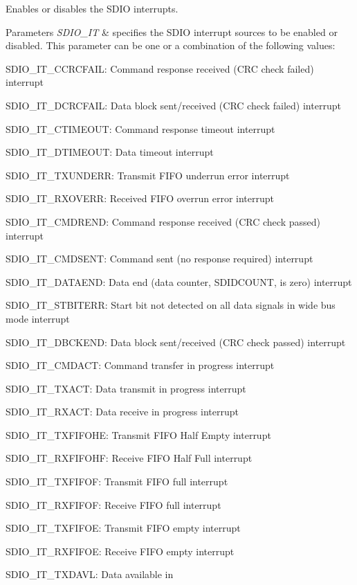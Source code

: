 Enables or disables the S\+D\+IO interrupts. 


\begin{DoxyParams}{Parameters}
{\em S\+D\+I\+O\+\_\+\+IT} & specifies the S\+D\+IO interrupt sources to be enabled or disabled. This parameter can be one or a combination of the following values\+: \begin{DoxyItemize}
\item S\+D\+I\+O\+\_\+\+I\+T\+\_\+\+C\+C\+R\+C\+F\+A\+IL\+: Command response received (C\+RC check failed) interrupt \item S\+D\+I\+O\+\_\+\+I\+T\+\_\+\+D\+C\+R\+C\+F\+A\+IL\+: Data block sent/received (C\+RC check failed) interrupt \item S\+D\+I\+O\+\_\+\+I\+T\+\_\+\+C\+T\+I\+M\+E\+O\+UT\+: Command response timeout interrupt \item S\+D\+I\+O\+\_\+\+I\+T\+\_\+\+D\+T\+I\+M\+E\+O\+UT\+: Data timeout interrupt \item S\+D\+I\+O\+\_\+\+I\+T\+\_\+\+T\+X\+U\+N\+D\+E\+RR\+: Transmit F\+I\+FO underrun error interrupt \item S\+D\+I\+O\+\_\+\+I\+T\+\_\+\+R\+X\+O\+V\+E\+RR\+: Received F\+I\+FO overrun error interrupt \item S\+D\+I\+O\+\_\+\+I\+T\+\_\+\+C\+M\+D\+R\+E\+ND\+: Command response received (C\+RC check passed) interrupt \item S\+D\+I\+O\+\_\+\+I\+T\+\_\+\+C\+M\+D\+S\+E\+NT\+: Command sent (no response required) interrupt \item S\+D\+I\+O\+\_\+\+I\+T\+\_\+\+D\+A\+T\+A\+E\+ND\+: Data end (data counter, S\+D\+I\+D\+C\+O\+U\+NT, is zero) interrupt \item S\+D\+I\+O\+\_\+\+I\+T\+\_\+\+S\+T\+B\+I\+T\+E\+RR\+: Start bit not detected on all data signals in wide bus mode interrupt \item S\+D\+I\+O\+\_\+\+I\+T\+\_\+\+D\+B\+C\+K\+E\+ND\+: Data block sent/received (C\+RC check passed) interrupt \item S\+D\+I\+O\+\_\+\+I\+T\+\_\+\+C\+M\+D\+A\+CT\+: Command transfer in progress interrupt \item S\+D\+I\+O\+\_\+\+I\+T\+\_\+\+T\+X\+A\+CT\+: Data transmit in progress interrupt \item S\+D\+I\+O\+\_\+\+I\+T\+\_\+\+R\+X\+A\+CT\+: Data receive in progress interrupt \item S\+D\+I\+O\+\_\+\+I\+T\+\_\+\+T\+X\+F\+I\+F\+O\+HE\+: Transmit F\+I\+FO Half Empty interrupt \item S\+D\+I\+O\+\_\+\+I\+T\+\_\+\+R\+X\+F\+I\+F\+O\+HF\+: Receive F\+I\+FO Half Full interrupt \item S\+D\+I\+O\+\_\+\+I\+T\+\_\+\+T\+X\+F\+I\+F\+OF\+: Transmit F\+I\+FO full interrupt \item S\+D\+I\+O\+\_\+\+I\+T\+\_\+\+R\+X\+F\+I\+F\+OF\+: Receive F\+I\+FO full interrupt \item S\+D\+I\+O\+\_\+\+I\+T\+\_\+\+T\+X\+F\+I\+F\+OE\+: Transmit F\+I\+FO empty interrupt \item S\+D\+I\+O\+\_\+\+I\+T\+\_\+\+R\+X\+F\+I\+F\+OE\+: Receive F\+I\+FO empty interrupt \item S\+D\+I\+O\+\_\+\+I\+T\+\_\+\+T\+X\+D\+A\+VL\+: Data available in 
\end{DoxyItemize}
\end{DoxyParams}
